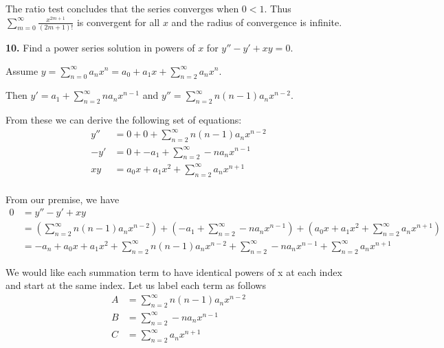 \documentclass{article}
\begin{document}
    The ratio test concludes that the series converges when $0 < 1$. Thus $\sum\limits_{m=0}^{\infty} \frac{x^{2m+1}}{(2m+1)!}$ is convergent for all $x$ and the radius of convergence is infinite. 
    
    \bigbreak
    
    \textbf{10.} Find a power series solution in powers of $x$ for $y''-y'+xy=0$.
    
    Assume $y=\sum\limits_{n=0}^{\infty}a_{n}x^{n} = a_{0} + a_{1}x + \sum\limits_{n=2}^{\infty}a_{n}x^{n}$.
    
    Then $y'= a_{1} + \sum\limits_{n=2}^{\infty}na_{n}x^{n-1}$ and $y''= \sum\limits_{n=2}^{\infty}n(n-1)a_{n}x^{n-2}$.
    
    From these we can derive the following set of equations:
    \begin{equation*}
    \begin{split}
    	y''& = 0 + 0 + \sum\limits_{n=2}^{\infty}n(n-1)a_{n}x^{n-2} \\
    	-y' & = 0 + -a_{1} + \sum\limits_{n=2}^{\infty}-na_{n}x^{n-1} \\
    	xy & = a_{0}x + a_{1}x^{2} + \sum\limits_{n=2}^{\infty}a_{n}x^{n+1} \\
    \end{split}
    \end{equation*}
    
    From our premise, we have 
    \begin{equation}
    \begin{split}
    	0 & = y''-y'+xy \\
    	& = (\sum\limits_{n=2}^{\infty}n(n-1)a_{n}x^{n-2}) +(-a_{1} + \sum\limits_{n=2}^{\infty}-na_{n}x^{n-1}) + (a_{0}x + a_{1}x^{2} + \sum\limits_{n=2}^{\infty}a_{n}x^{n+1}) \\
    	& = -a_{n} + a_{0}x + a_{1}x^{2} + \sum\limits_{n=2}^{\infty}n(n-1)a_{n}x^{n-2} + \sum\limits_{n=2}^{\infty}-na_{n}x^{n-1} + \sum\limits_{n=2}^{\infty}a_{n}x^{n+1}
    \end{split}
    \end{equation}
    
    We would like each summation term to have identical powers of x at each index and start at the same index. Let us label each term as follows 
    \begin{equation}
    \begin{split}
    	A & = \sum\limits_{n=2}^{\infty}n(n-1)a_{n}x^{n-2} \\
    	B & = \sum\limits_{n=2}^{\infty}-na_{n}x^{n-1} \\
    	C & = \sum\limits_{n=2}^{\infty}a_{n}x^{n+1}
    \end{split}
    \end{equation}
    
\end{document}

